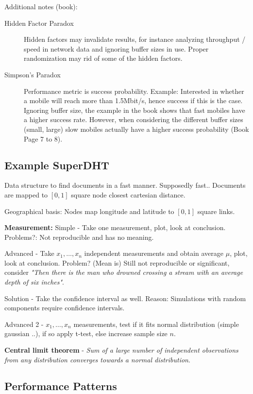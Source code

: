 Additional notes (book):

\begin{description}
    \item[Hidden Factor Paradox] Hidden factors may invalidate results, for instance analyzing throughput / speed in network data and ignoring buffer sizes in use. Proper randomization may rid of some of the hidden factors.
    \item[Simpson's Paradox] Performance metric is success probability. Example: Interested in whether a mobile will reach more than 1.5Mbit/s, hence success if this is the case. Ignoring buffer size, the example in the book shows that fast mobiles have a higher success rate. However, when considering the different buffer sizes (small, large) slow mobiles actually have a higher success probability (Book Page 7 to 8).
\end{description}

\subsection{Example SuperDHT}

Data structure to find documents in a fast manner. Supposedly fast.. Documents are mapped to $[0,1]$ square node closest cartesian distance.

Geographical basis: Nodes map longitude and latitude to $[0,1]$ square links.

\textbf{Measurement:} Simple - Take one measurement, plot, look at conclusion. Problems?: Not reproducible and has no meaning.

Advanced - Take $x_1, \dots, x_n$ independent measurements and obtain average $\mu$, plot, look at conclusion. Problem? (Mean is) Still not reproducible or significant, consider \textit{"Then there is the man who drowned crossing a stream with an average depth of six inches"}.

Solution - Take the confidence interval as well. Reason: Simulations with random components require confidence intervals.

Advanced 2 - $x_1, \dots , x_n$ measurements, test if it fits normal distribution (simple gaussian ..), if so apply t-test, else increase sample size $n$.

\textbf{Central limit theorem} - \textit{Sum of a large number of independent observations from any distribution converges towards a normal distribution}.

\subsection{Performance Patterns}

